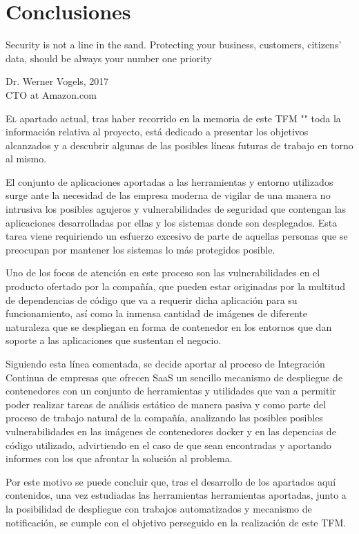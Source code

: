 \chapter{Conclusiones}\label{chp-05}
\epigraph{Security is not a line in the sand. Protecting your business, customers, citizens’ data, should be always your number one priority}{Dr. Werner Vogels, 2017\\CTO at Amazon.com}

\lettrine[lraise=-0.1, lines=2, loversize=0.2]{E}{l} apartado actual, tras haber recorrido en la memoria de este \gls{TFM} "\eltitulo" toda la información relativa al proyecto, está dedicado a presentar los objetivos alcanzados y a descubrir algunas de las posibles líneas futuras de trabajo en torno al mismo. 

El conjunto de aplicaciones aportadas a las herramientas y entorno utilizados surge ante la necesidad de las empresa moderna de vigilar de una manera no intrusiva los posibles agujeros y vulnerabilidades de seguridad que contengan las aplicaciones desarrolladas por ellas y los sistemas donde son desplegados. Esta tarea viene requiriendo un esfuerzo excesivo de parte de aquellas personas que se preocupan por mantener los sistemas lo más protegidos posible. 

Uno de los focos de atención en este proceso son las vulnerabilidades en el producto ofertado por la compañía, que pueden estar originadas por la multitud de dependencias de código que va a requerir dicha aplicación para su funcionamiento, así como la inmensa cantidad de imágenes de diferente naturaleza que se despliegan en forma de contenedor en los entornos que dan soporte a las aplicaciones que sustentan el negocio.

Siguiendo esta línea comentada, se decide aportar al proceso de Integración Continua de empresas que ofrecen \gls{SaaS} un sencillo mecanismo de despliegue de contenedores con un conjunto de herramientas y utilidades que van a permitir poder realizar tareas de análisis estático de manera pasiva y como parte del proceso de trabajo natural de la compañía, analizando las posibles posibles vulnerabilidades en las imágenes de contenedores docker y en las depencias  de código utilizado, advirtiendo en el caso de que sean encontradas y aportando informes con los que afrontar la solución al problema.

Por este motivo se puede concluir que, tras el desarrollo de los apartados aquí contenidos, una vez estudiadas las herramientas herramientas aportadas, junto a la posibilidad de despliegue con trabajos automatizados y mecanismo de notificación, se cumple con el objetivo perseguido en la realización de este \gls{TFM}.


